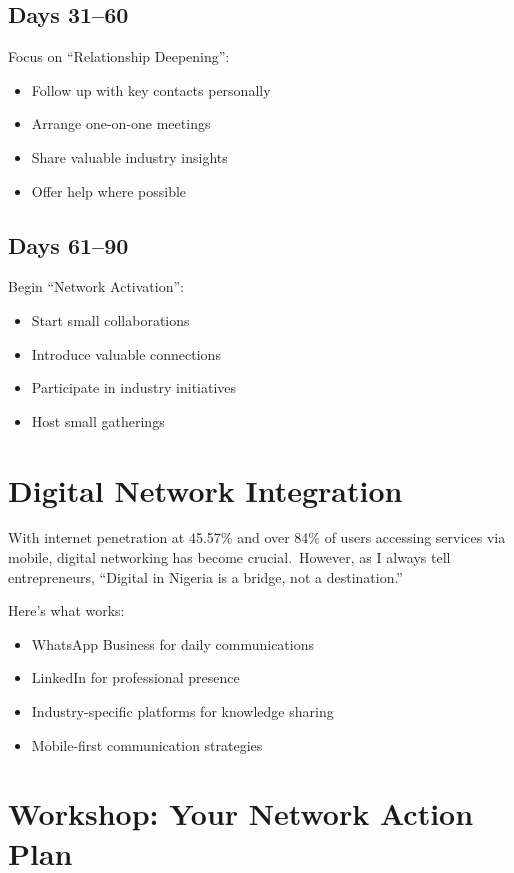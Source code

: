 \subsection{Days 31--60}\label{subsec:days-31-60}

Focus on ``Relationship Deepening'':
\begin{itemize}
    \item Follow up with key contacts personally
    \item Arrange one-on-one meetings
    \item Share valuable industry insights
    \item Offer help where possible
\end{itemize}

\subsection{Days 61--90}\label{subsec:days-61-90}

Begin ``Network Activation'':
\begin{itemize}
    \item Start small collaborations
    \item Introduce valuable connections
    \item Participate in industry initiatives
    \item Host small gatherings
\end{itemize}

\section{Digital Network Integration}\label{sec:digital-networks}

With internet penetration at 45.57\% and over 84\% of users accessing services via mobile, digital networking has become crucial.\ However, as I always tell entrepreneurs, ``Digital in Nigeria is a bridge, not a destination.''

Here's what works:
\begin{itemize}
    \item WhatsApp Business for daily communications
    \item LinkedIn for professional presence
    \item Industry-specific platforms for knowledge sharing
    \item Mobile-first communication strategies
\end{itemize}

\section{Workshop: Your Network Action Plan}\label{sec:network-workshop}

